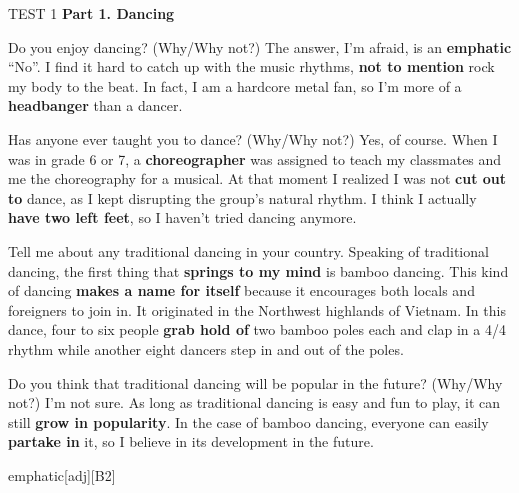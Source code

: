 \begin{glossarymc}[Cambridge 6]
    \begin{test}{TEST 1}
    \noindent
    \textbf{Part 1. Dancing}
    \begin{qa}{Do you enjoy dancing? (Why/Why not?)}
    The answer, I’m afraid, is an \textbf{emphatic} “No”. I find it hard to catch up with the music rhythms, \textbf{not to mention} rock my body to the beat. In fact, I am a hardcore metal fan, so I’m more of a \textbf{headbanger} than a dancer.
    \end{qa}

    \begin{qa}{Has anyone ever taught you to dance? (Why/Why not?)}
    Yes, of course. When I was in grade 6 or 7, a \textbf{choreographer} was assigned to teach my classmates and me the choreography for a musical. At that moment I realized I was not \textbf{cut out to} dance, as I kept disrupting the group’s natural rhythm. I think I actually \textbf{have two left feet}, so I haven’t tried dancing anymore.
    \end{qa}

    \begin{qa}{Tell me about any traditional dancing in your country.}
    Speaking of traditional dancing, the first thing that \textbf{springs to my mind} is bamboo dancing. This kind of dancing \textbf{makes a name for itself} because it encourages both locals and foreigners to join in. It originated in the Northwest highlands of Vietnam. In this dance, four to six people \textbf{grab hold of} two bamboo poles each and clap in a 4/4 rhythm while another eight dancers step in and out of the poles.
    \end{qa}

    \begin{qa}{Do you think that traditional dancing will be popular in the future? (Why/Why not?)}
    I’m not sure. As long as traditional dancing is easy and fun to play, it can still \textbf{grow in popularity}. In the case of bamboo dancing, everyone can easily \textbf{partake in} it, so I believe in its development in the future.
    \end{qa}

    
        \begin{VocabExplain}[Part 1]
            \begin{ExplainCard}{emphatic}[adj][B2]
            \end{ExplainCard}


\end{VocabExplain}
\end{test}
\end{glossarymc}
